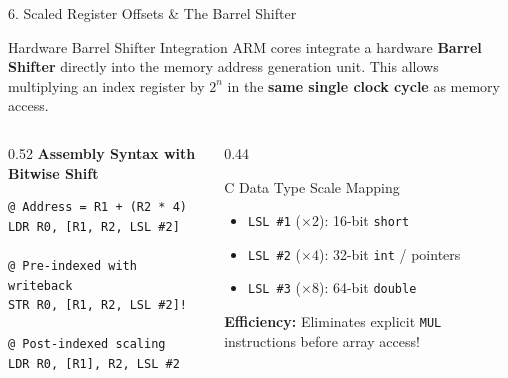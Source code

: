 \documentclass[aspectratio=169,10pt]{beamer}
\begin{document}
\begin{frame}[fragile]{6. Scaled Register Offsets \& The Barrel Shifter}
  \begin{block}{Hardware Barrel Shifter Integration}
    ARM cores integrate a hardware \textbf{Barrel Shifter} directly into the memory address generation unit. This allows multiplying an index register by $2^n$ in the \textbf{same single clock cycle} as memory access.
  \end{block}

  \vspace{0.2cm}
  \begin{columns}[T]
    \begin{column}{0.52\textwidth}
      \textbf{Assembly Syntax with Bitwise Shift}
      \begin{lstlisting}
@ Address = R1 + (R2 * 4)
LDR R0, [R1, R2, LSL #2]

@ Pre-indexed with writeback
STR R0, [R1, R2, LSL #2]!

@ Post-indexed scaling
LDR R0, [R1], R2, LSL #2
      \end{lstlisting}
    \end{column}

    \begin{column}{0.44\textwidth}
      \begin{exampleblock}{C Data Type Scale Mapping}
        \begin{itemize}
          \item \texttt{LSL \#1} ($\times 2$): 16-bit \texttt{short}
          \item \texttt{LSL \#2} ($\times 4$): 32-bit \texttt{int} / pointers
          \item \texttt{LSL \#3} ($\times 8$): 64-bit \texttt{double}
        \end{itemize}
      \end{exampleblock}

      \vspace{0.1cm}
      \small \textbf{Efficiency:} Eliminates explicit \texttt{MUL} instructions before array access!
    \end{column}
  \end{columns}
\end{frame}
\end{document}
